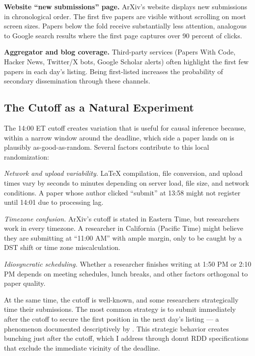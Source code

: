 \documentclass[12pt]{article}
\begin{document}
\textbf{Website ``new submissions'' page.} ArXiv's website displays new submissions in chronological order. The first five papers are visible without scrolling on most screen sizes. Papers below the fold receive substantially less attention, analogous to Google search results where the first page captures over 90 percent of clicks.

\textbf{Aggregator and blog coverage.} Third-party services (Papers With Code, Hacker News, Twitter/X bots, Google Scholar alerts) often highlight the first few papers in each day's listing. Being first-listed increases the probability of secondary dissemination through these channels.

\subsection{The Cutoff as a Natural Experiment}

The 14:00 ET cutoff creates variation that is useful for causal inference because, within a narrow window around the deadline, which side a paper lands on is plausibly as-good-as-random. Several factors contribute to this local randomization:

\textit{Network and upload variability.} LaTeX compilation, file conversion, and upload times vary by seconds to minutes depending on server load, file size, and network conditions. A paper whose author clicked ``submit'' at 13:58 might not register until 14:01 due to processing lag.

\textit{Timezone confusion.} ArXiv's cutoff is stated in Eastern Time, but researchers work in every timezone. A researcher in California (Pacific Time) might believe they are submitting at ``11:00 AM'' with ample margin, only to be caught by a DST shift or time zone miscalculation.

\textit{Idiosyncratic scheduling.} Whether a researcher finishes writing at 1:50 PM or 2:10 PM depends on meeting schedules, lunch breaks, and other factors orthogonal to paper quality.

At the same time, the cutoff is well-known, and some researchers strategically time their submissions. The most common strategy is to submit immediately after the cutoff to secure the first position in the next day's listing --- a phenomenon documented descriptively by \citet{haque2009}. This strategic behavior creates bunching just after the cutoff, which I address through donut RDD specifications that exclude the immediate vicinity of the deadline.
\end{document}

